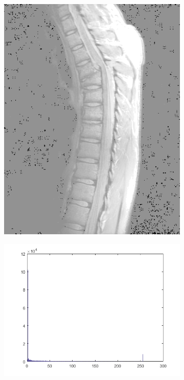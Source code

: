 \begin{figure}[h!]
\begin{subfigure}[b]{0.45\linewidth}
		\includegraphics[width=\linewidth]{myfigure/p1/g1.png}
		\caption{}
		\label{fig:g1}
	\end{subfigure}
	\begin{subfigure}[b]{0.45\linewidth}
    	\includegraphics[width=\linewidth]{myfigure/p1/fbar1.png}

\end{subfigure}
\end{figure}
